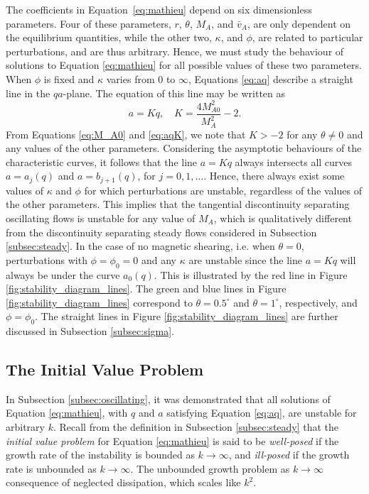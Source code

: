 The coefficients in Equation~\eqref{eq:mathieu} depend on six dimensionless parameters.
Four of these parameters, $r$, $\theta$, $M_A$, and $\bar v_A$, are only dependent on the equilibrium quantities, while the other two, $\kappa$, and $\phi$, are related to particular perturbations, and are thus arbitrary.
Hence, we must study the behaviour of solutions to Equation \eqref{eq:mathieu} for all possible values of these two parameters.
When $\phi$ is fixed and $\kappa$ varies from 0 to $\infty$, Equations \eqref{eq:aq} describe a straight line in the $qa$-plane.
The equation of this line may be written as 
%
\begin{equation}
\label{eq:aqK}
a = Kq, \quad K = \frac{4 M_{A 0}^2}{M_A^2} - 2.
\end{equation}
%
From Equations \eqref{eq:M_A0} and \eqref{eq:aqK}, we note that $K > -2$ for any $\theta \neq 0$ and any values of the other parameters.
Considering the asymptotic behaviours of the characteristic curves, it follows that the line $a = K q$ always intersects all curves $a = a_j(q)$ and $a = b_{j+1}(q)$, for $j = 0,1,\dots$.
Hence, there always exist some values of $\kappa$ and $\phi$ for which perturbations are unstable, regardless of the values of the other parameters.
This implies that the tangential discontinuity separating oscillating flows is unstable for any value of $M_A$, which is qualitatively different from the discontinuity separating steady flows considered in Subsection \ref{subsec:steady}.
In the case of no magnetic shearing, i.e. when $\theta = 0$, perturbations with $\phi = \phi_0 = 0$ and any $\kappa$ are unstable since the line $a = K q$ will always be under the curve $a_0(q)$.
This is illustrated by the red line in Figure \ref{fig:stability_diagram_lines}.
The green and blue lines in Figure \ref{fig:stability_diagram_lines} correspond to $\theta = 0.5^\circ$ and $\theta = 1^\circ$, respectively, and $\phi = \phi_0$.
The straight lines in Figure \ref{fig:stability_diagram_lines} are further discussed in Subsection \ref{subsec:sigma}.

\subsection{The Initial Value Problem}
\label{subsec:ivp}

In Subsection \ref{subsec:oscillating}, it was demonstrated that all solutions of Equation \eqref{eq:mathieu}, with $q$ and $a$ satisfying Equation \eqref{eq:aq}, are unstable for arbitrary $k$.
Recall from the definition in Subsection \ref{subsec:steady} that the \emph{initial value problem} for Equation \eqref{eq:mathieu} is said to be \emph{well-posed} if the growth rate of the instability is bounded as $k \to \infty$, and \emph{ill-posed} if the growth rate is unbounded as $k \to \infty$.
The unbounded growth problem as $k \to \infty$ consequence of neglected dissipation, which scales like $k^2$.

